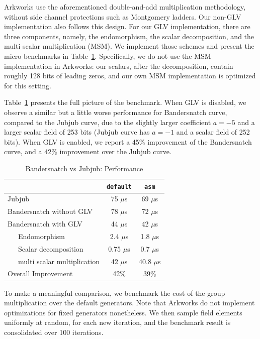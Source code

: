 \documentclass{article}
\theoremstyle{definition}
\begin{document}
Arkworks use the aforementioned double-and-add
multiplication methodology, without side channel protections such 
as Montgomery ladders. Our non-GLV implementation also follows
this design. For our GLV implementation, there are three components,
namely, the endomorphism, the scalar decomposition, and the
multi scalar multiplication (MSM). We implement those schemes and 
present the micro-benchmarks in Table~\ref{tab:comp_full}.
Specifically, we do not use the MSM implementation in Arkworks:
our scalars, after the decomposition, contain roughly 128 bits
of leading zeros, and our own MSM implementation is 
optimized for this setting.

Table~\ref{tab:comp_full} presents the full picture of the benchmark.
When GLV is disabled, we observe a similar but a little worse 
performance for Bandersnatch curve, compared to
the Jubjub curve, due to the slightly larger coefficient 
$a=-5$ and a larger scalar field of 253 bits (Jubjub curve has $a=-1$
and a scalar field of 252 bits).
When GLV is enabled, we report a 45\% improvement of the Bandersnatch
curve, and a 42\% improvement over the Jubjub curve.

\begin{table}[ht] %
  \centering
  
  \begin{tabular}{|l|c|c|}\hline
      & \texttt{default} & \texttt{asm}\\\hline\hline
    Jubjub & 75 $\mu$s & 69 $\mu$s \\\hline\hline
    Bandersnatch without GLV & 78 $\mu$s & 72 $\mu$s  \\\hline\hline   
    Bandersnatch with GLV& 44 $\mu$s & 42 $\mu$s \\\hline
    \ \ \ Endomorphism & 2.4 $\mu$s& 1.8 $\mu$s\\\hline
    \ \ \ Scalar decomposition & 0.75 $\mu$s & 0.7 $\mu$s \\\hline
    \ \ \ multi scalar multiplication & 42 $\mu$s &  40.8 $\mu$s\\\hline\hline
    Overall Improvement & 42\% & 39\% \\\hline
  \end{tabular}
  \caption{Bandersnatch vs Jubjub: Performance}
  \label{tab:comp_full}
\end{table}

To make a meaningful comparison, we benchmark
the cost of the group multiplication over the default generators.
Note that Arkworks do not implement optimizations for 
fixed generators nonetheless. We then sample field elements 
uniformly at random, for each new iteration, and the benchmark
result is consolidated over 100 iterations.
\end{document}
